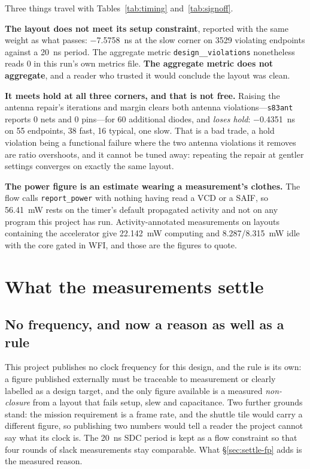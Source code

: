 \documentclass[11pt,a4paper]{article}
\newcommand{\file}[1]{\texttt{\small #1}}
\begin{document}
Three things travel with Tables~\ref{tab:timing} and~\ref{tab:signoff}.

\textbf{The layout does not meet its setup constraint}, reported with
the same weight as what passes: \SI{-7.5758}{\nano\second} at the slow
corner on \num{3529} violating endpoints against a
\SI{20}{\nano\second} period. The aggregate metric
\texttt{design\_\_violations} nonetheless reads \num{0} in this run's
own metrics file. \textbf{The aggregate metric does not aggregate}, and
a reader who trusted it would conclude the layout was clean.

\textbf{It meets hold at all three corners, and that is not free.}
Raising the antenna repair's iterations and margin clears both antenna
violations---\file{s83ant} reports \num{0} nets and \num{0} pins---for
\num{60} additional diodes, and \emph{loses hold}:
\SI{-0.4351}{\nano\second} on \num{55} endpoints, \num{38} fast,
\num{16} typical, one slow. That is a bad trade, a hold violation being
a functional failure where the two antenna violations it removes are
ratio overshoots, and it cannot be tuned away: repeating the repair at
gentler settings converges on exactly the same layout.

\textbf{The power figure is an estimate wearing a measurement's
clothes.} The flow calls \texttt{report\_power} with nothing having
read a VCD or a SAIF, so \SI{56.41}{\milli\watt} rests on the timer's
default propagated activity and not on any program this project has
run. Activity-annotated measurements on layouts containing the
accelerator give \SI{22.142}{\milli\watt} computing and
\SI{8.287}{}/\SI{8.315}{\milli\watt} idle with the core gated in WFI,
and those are the figures to quote.

\section{What the measurements settle}
\label{sec:settle}

\subsection{No frequency, and now a reason as well as a rule}

This project publishes no clock frequency for this design, and the rule
is its own: a figure published externally must be traceable to
measurement or clearly labelled as a design target, and the only figure
available is a measured \emph{non-closure} from a layout that fails
setup, slew and capacitance. Two further grounds stand: the mission
requirement is a frame rate, and the shuttle tile would carry a
different figure, so publishing two numbers would tell a reader the
project cannot say what its clock is. The \SI{20}{\nano\second} SDC
period is kept as a flow constraint so that four rounds of slack
measurements stay comparable. What \S\ref{sec:settle-fp} adds is the
measured reason.
\end{document}
